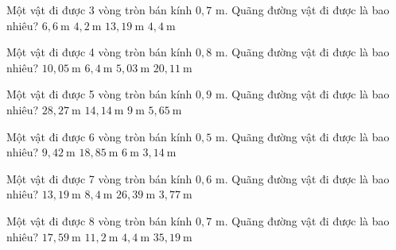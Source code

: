\begin{ex}
Một vật đi được 3 vòng tròn bán kính $0,7$ m. Quãng đường vật đi được là bao nhiêu?
\choice
{$6,6\ \mathrm{m}$}
{$4,2\ \mathrm{m}$}
{\True $13,19\ \mathrm{m}$}
{$4,4\ \mathrm{m}$}
\end{ex}

\begin{ex}
Một vật đi được 4 vòng tròn bán kính $0,8$ m. Quãng đường vật đi được là bao nhiêu?
\choice
{$10,05\ \mathrm{m}$}
{$6,4\ \mathrm{m}$}
{$5,03\ \mathrm{m}$}
{\True $20,11\ \mathrm{m}$}
\end{ex}

\begin{ex}
Một vật đi được 5 vòng tròn bán kính $0,9$ m. Quãng đường vật đi được là bao nhiêu?
\choice
{\True $28,27\ \mathrm{m}$}
{$14,14\ \mathrm{m}$}
{$9\ \mathrm{m}$}
{$5,65\ \mathrm{m}$}
\end{ex}

\begin{ex}
Một vật đi được 6 vòng tròn bán kính $0,5$ m. Quãng đường vật đi được là bao nhiêu?
\choice
{$9,42\ \mathrm{m}$}
{\True $18,85\ \mathrm{m}$}
{$6\ \mathrm{m}$}
{$3,14\ \mathrm{m}$}
\end{ex}

\begin{ex}
Một vật đi được 7 vòng tròn bán kính $0,6$ m. Quãng đường vật đi được là bao nhiêu?
\choice
{$13,19\ \mathrm{m}$}
{$8,4\ \mathrm{m}$}
{\True $26,39\ \mathrm{m}$}
{$3,77\ \mathrm{m}$}
\end{ex}

\begin{ex}
Một vật đi được 8 vòng tròn bán kính $0,7$ m. Quãng đường vật đi được là bao nhiêu?
\choice
{$17,59\ \mathrm{m}$}
{$11,2\ \mathrm{m}$}
{$4,4\ \mathrm{m}$}
{\True $35,19\ \mathrm{m}$}
\end{ex}

